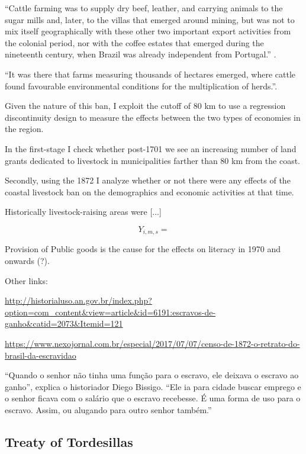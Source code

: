 \documentclass{article}
\begin{document}
``Cattle farming was to supply dry beef, leather, and carrying animals to the sugar mills and, later, to the villas that emerged around mining, but was not to mix itself geographically with these other two important export activities from the colonial period, nor with the coffee estates that emerged during the nineteenth century,  when  Brazil was already independent from  Portugal.'' \parencite{Ribeiro2012-lb}.

``It was there that farms measuring thousands of hectares emerged, where cattle found favourable environmental conditions for the multiplication of herds.''\parencite{Ribeiro2012-lb}.


Given the nature of this ban, I exploit the cutoff of 80 km to use a regression discontinuity design to measure the effects between the two types of economies in the region. 

In the first-stage I check whether post-1701 we see an increasing number of land grants dedicated to livestock in municipalities farther than 80 km from the coast. 

Secondly, using the 1872 I analyze whether or not there were any effects of the coastal livestock ban on the demographics and economic activities at that time.




Historically livestock-raising areas were [...]

\begin{equation}
  Y_{i,m,s} = 
\end{equation}

Provision of Public goods is the cause for the effects on literacy in 1970 and onwards (?).

Other links:

\url{http://historialuso.an.gov.br/index.php?option=com_content&view=article&id=6191:escravos-de-ganho&catid=2073&Itemid=121}

\url{https://www.nexojornal.com.br/especial/2017/07/07/censo-de-1872-o-retrato-do-brasil-da-escravidao}

“Quando o senhor não tinha uma função para o escravo, ele deixava o escravo ao ganho”, explica o historiador Diego Bissigo. “Ele ia para cidade buscar emprego e o senhor ficava com o salário que o escravo recebesse. É uma forma de uso para o escravo. Assim, ou alugando para outro senhor também.”



\parencite[p.~142]{De_Oliveira_Andrade1980-xz}

\subsection{Treaty of Tordesillas}
\end{document}
